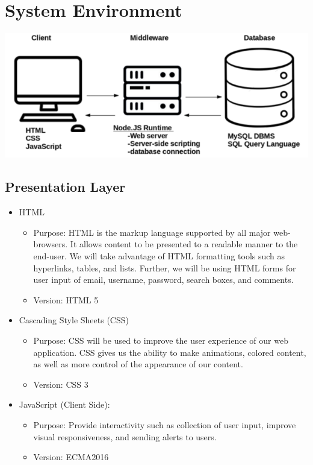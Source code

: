 \documentclass[letter, 12pt, titlepage]{article}
\begin{document}
	\section{System Environment}
	
			\includegraphics[scale=.66]{3-tier.png}
			\subsection{Presentation Layer}
			\begin{itemize}
			 \item HTML
				\begin{itemize}
					\item Purpose: HTML is the markup language supported by all major web-browsers. It allows content to be presented to a readable manner to the end-user. We will take advantage of HTML formatting tools such as hyperlinks, tables, and lists. Further, we will be using HTML forms for user input of email, username, password, search boxes, and comments.
					\item Version: HTML 5
				\end{itemize}
			\item Cascading Style Sheets (CSS)
			\begin{itemize}	
				\item Purpose: CSS will be used to improve the user experience of our web application. CSS gives us the ability to make animations, colored content, as well as more control of the appearance of our content.
				\item Version: CSS 3
			\end{itemize}
			\item	JavaScript (Client Side):
				\begin{itemize}
					\item	Purpose: Provide interactivity such as collection of user input, improve visual responsiveness, and sending alerts to users.
					\item Version: ECMA2016
				\end{itemize}
			\end{itemize}
\end{document}
